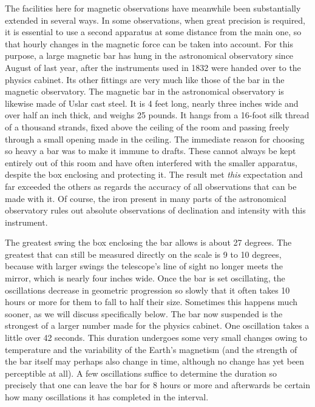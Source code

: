 The facilities here for magnetic observations have meanwhile been substantially extended in several ways. In some observations, when great precision is required, it is essential to use a second apparatus at some distance from the main one, so that hourly changes in the magnetic force can be taken into account. For this purpose, a large magnetic bar has hung in the astronomical observatory since August of last year, after the instruments used in 1832 were handed over to the physics cabinet. Its other fittings are very much like those of the bar in the magnetic observatory. The magnetic bar in the astronomical observatory is likewise made of Uslar cast steel. It is 4 feet long, nearly three inches wide and over half an inch thick, and weighs 25 pounds. It hangs from a 16-foot silk thread of a thousand strands, fixed above the ceiling of the room and passing freely through a small opening made in the ceiling. The immediate reason for choosing so heavy a bar was to make it immune to drafts. These cannot always be kept entirely out of this room and have often interfered with the smaller apparatus, despite the box enclosing and protecting it. The result met \textit{this} expectation and far exceeded the others as regards the accuracy of all observations that can be made with it. Of course, the iron present in many parts of the astronomical observatory rules out absolute observations of declination and intensity with this instrument.

The greatest swing the box enclosing the bar allows is about 27 degrees. The greatest that can still be measured directly on the scale is 9 to 10 degrees, because with larger swings the telescope’s line of sight no longer meets the mirror, which is nearly four inches wide. Once the bar is set oscillating, the oscillations decrease in geometric progression so slowly that it often takes 10 hours or more for them to fall to half their size. Sometimes this happens much sooner, as we will discuss specifically below. The bar now suspended is the strongest of a larger number made for the physics cabinet. One oscillation takes a little over 42 seconds. This duration undergoes some very small changes owing to temperature and the variability of the Earth’s magnetism (and the strength of the bar itself may perhaps also change in time, although no change has yet been perceptible at all). A few oscillations suffice to determine the duration so precisely that one can leave the bar for 8 hours or more and afterwards be certain how many oscillations it has completed in the interval.

